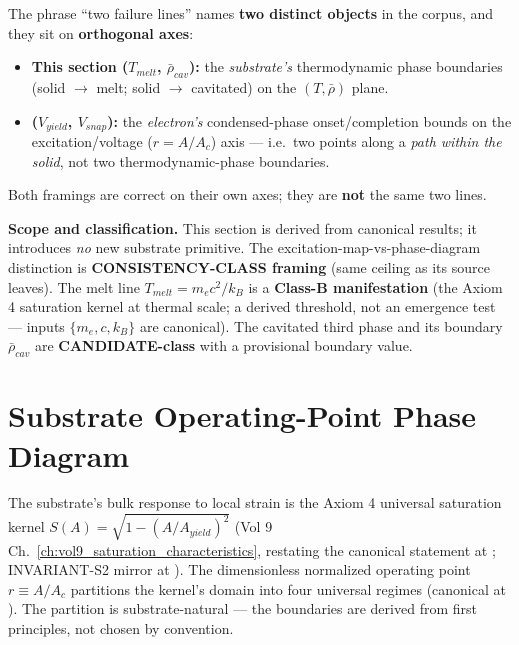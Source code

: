 \begin{warningbox}
The phrase ``two failure lines'' names \textbf{two distinct objects} in the corpus, and they sit on \textbf{orthogonal axes}:
\begin{itemize}
    \item \textbf{This section ($T_{melt}$, $\bar\rho_{cav}$):} the \emph{substrate's} thermodynamic phase boundaries (solid $\to$ melt; solid $\to$ cavitated) on the $(T, \bar\rho)$ plane.
    \item \textbf{ ($V_{yield}$, $V_{snap}$):} the \emph{electron's} condensed-phase onset/completion bounds on the excitation/voltage ($r = A/A_c$) axis --- i.e.\ two points along a \emph{path within the solid}, not two thermodynamic-phase boundaries.
\end{itemize}
Both framings are correct on their own axes; they are \textbf{not} the same two lines.
\end{warningbox}

\textbf{Scope and classification.} This section is derived from canonical results; it introduces \emph{no} new substrate primitive. The excitation-map-vs-phase-diagram distinction is \textbf{CONSISTENCY-CLASS framing} (same ceiling as its source leaves). The melt line $T_{melt} = m_e c^2/k_B$ is a \textbf{Class-B manifestation} (the Axiom 4 saturation kernel at thermal scale; a derived threshold, not an emergence test --- inputs $\{m_e, c, k_B\}$ are canonical). The cavitated third phase and its boundary $\bar\rho_{cav}$ are \textbf{CANDIDATE-class} with a provisional boundary value.

\section{Substrate Operating-Point Phase Diagram}
\label{sec:vol9_phase_operating_point}

The substrate's bulk response to local strain is the Axiom 4 universal saturation kernel $S(A) = \sqrt{1 - (A/A_{yield})^2}$ (Vol 9 Ch.~\ref{ch:vol9_saturation_characteristics}, restating the canonical statement at ; INVARIANT-S2 mirror at ). The dimensionless normalized operating point $r \equiv A/A_c$ partitions the kernel's domain into four universal regimes (canonical at ). The partition is substrate-natural --- the boundaries are derived from first principles, not chosen by convention.

